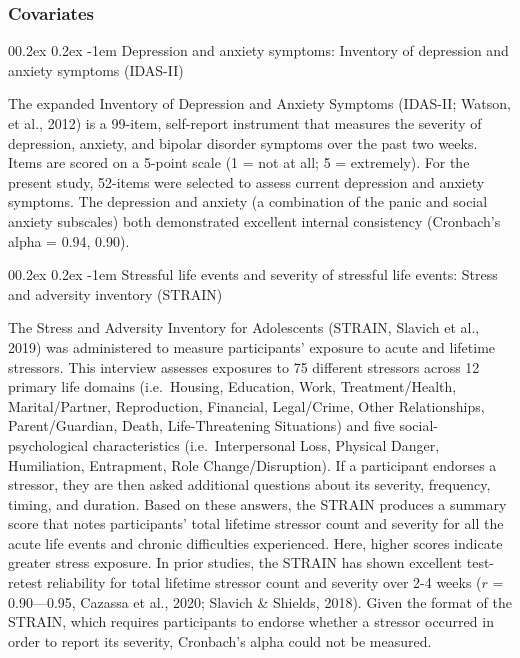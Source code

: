 \documentclass[
  man]{apa7}
\makeatletter
\let\oldparagraph\paragraph
\renewcommand{\paragraph}[1]{\oldparagraph{#1}\mbox{}}
\renewcommand{\paragraph}{\@startsection{paragraph}{4}{\parindent}%
  {0\baselineskip \@plus 0.2ex \@minus 0.2ex}%
  {-1em}%
  {\normalfont\normalsize\bfseries\itshape\typesectitle}}
\makeatother
\begin{document}
\hypertarget{covariates}{%
\subsubsection{Covariates}\label{covariates}}

\hypertarget{depression-and-anxiety-symptoms-inventory-of-depression-and-anxiety-symptoms-idas-ii}{%
\paragraph{Depression and anxiety symptoms: Inventory of depression and anxiety symptoms (IDAS-II)}\label{depression-and-anxiety-symptoms-inventory-of-depression-and-anxiety-symptoms-idas-ii}}

The expanded Inventory of Depression and Anxiety Symptoms (IDAS-II; Watson, et al., 2012) is a 99-item, self-report instrument that measures the severity of depression, anxiety, and bipolar disorder symptoms over the past two weeks. Items are scored on a 5-point scale (1 = not at all; 5 = extremely). For the present study, 52-items were selected to assess current depression and anxiety symptoms. The depression and anxiety (a combination of the panic and social anxiety subscales) both demonstrated excellent internal consistency (Cronbach's alpha = 0.94, 0.90).

\hypertarget{stressful-life-events-and-severity-of-stressful-life-events-stress-and-adversity-inventory-strain}{%
\paragraph{Stressful life events and severity of stressful life events: Stress and adversity inventory (STRAIN)}\label{stressful-life-events-and-severity-of-stressful-life-events-stress-and-adversity-inventory-strain}}

The Stress and Adversity Inventory for Adolescents (STRAIN, Slavich et al., 2019) was administered to measure participants' exposure to acute and lifetime stressors. This interview assesses exposures to 75 different stressors across 12 primary life domains (i.e.~Housing, Education, Work, Treatment/Health, Marital/Partner, Reproduction, Financial, Legal/Crime, Other Relationships, Parent/Guardian, Death, Life-Threatening Situations) and five social-psychological characteristics (i.e.~Interpersonal Loss, Physical Danger, Humiliation, Entrapment, Role Change/Disruption). If a participant endorses a stressor, they are then asked additional questions about its severity, frequency, timing, and duration. Based on these answers, the STRAIN produces a summary score that notes participants' total lifetime stressor count and severity for all the acute life events and chronic difficulties experienced. Here, higher scores indicate greater stress exposure. In prior studies, the STRAIN has shown excellent test-retest reliability for total lifetime stressor count and severity over 2-4 weeks (\(r\) = 0.90---0.95, Cazassa et al., 2020; Slavich \& Shields, 2018). Given the format of the STRAIN, which requires participants to endorse whether a stressor occurred in order to report its severity, Cronbach's alpha could not be measured.
\end{document}
